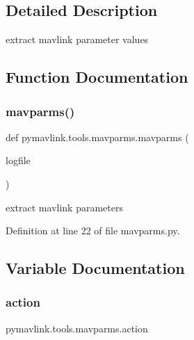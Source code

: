\subsection{Detailed Description}
\begin{DoxyVerb}extract mavlink parameter values
\end{DoxyVerb}
 

\subsection{Function Documentation}
\mbox{\label{namespacepymavlink_1_1tools_1_1mavparms_a2c8ba68bb852463fbf55c9823e303d0a}} 
\subsubsection{\texorpdfstring{mavparms()}{mavparms()}}
{\footnotesize\ttfamily def pymavlink.\+tools.\+mavparms.\+mavparms (\begin{DoxyParamCaption}\item[{}]{logfile }\end{DoxyParamCaption})}

\begin{DoxyVerb}extract mavlink parameters\end{DoxyVerb}
 

Definition at line 22 of file mavparms.\+py.



\subsection{Variable Documentation}
\mbox{\label{namespacepymavlink_1_1tools_1_1mavparms_ac3b752a6d40c36b801353d1fc4896fd3}} 
\subsubsection{\texorpdfstring{action}{action}}
{\footnotesize\ttfamily pymavlink.\+tools.\+mavparms.\+action}



